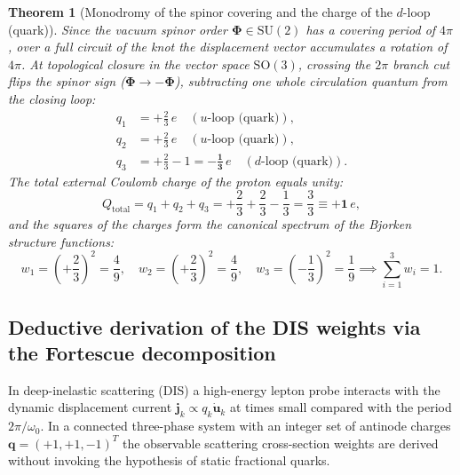\documentclass[11pt,a4paper]{article}
\newtheorem{theorem}{Theorem}
\theoremstyle{definition}
\theoremstyle{remark}
\begin{document}
\begin{theorem}[Monodromy of the spinor covering and the charge of the $d$-loop (quark)]
\label{thm:d_quark_charge_spinor_cut}
Since the vacuum spinor order $\boldsymbol{\Phi} \in \mathrm{SU}(2)$ has a covering period of $4\pi$, over a full circuit of the knot the displacement vector accumulates a rotation of $4\pi$. At topological closure in the vector space $\mathrm{SO}(3)$, crossing the $2\pi$ branch cut flips the spinor sign ($\boldsymbol{\Phi} \to -\boldsymbol{\Phi}$), subtracting one whole circulation quantum from the closing loop:
\begin{align}
    q_1 &= +\frac{2}{3} \, e \quad (u\text{-loop (quark)}), \label{eq:q_u1_exact} \\
    q_2 &= +\frac{2}{3} \, e \quad (u\text{-loop (quark)}), \label{eq:q_u2_exact} \\
    q_3 &= +\frac{2}{3} - 1 = -\frac{\mathbf{1}}{\mathbf{3}} \, e \quad (d\text{-loop (quark)}). \label{eq:q_d_exact}
\end{align}
The total external Coulomb charge of the proton equals unity:
\begin{equation}
    Q_{\mathrm{total}} = q_1 + q_2 + q_3 = +\frac{2}{3} + \frac{2}{3} - \frac{1}{3} = \frac{3}{3} \equiv +\mathbf{1} \, e,
\end{equation}
and the squares of the charges form the canonical spectrum of the Bjorken structure functions:
\begin{equation}
    w_1 = \left(+\frac{2}{3}\right)^2 = \frac{4}{9}, \quad w_2 = \left(+\frac{2}{3}\right)^2 = \frac{4}{9}, \quad w_3 = \left(-\frac{1}{3}\right)^2 = \frac{1}{9} \implies \sum_{i=1}^3 w_i = 1.
\end{equation}
\end{theorem}

\subsection{Deductive derivation of the DIS weights via the Fortescue decomposition}

In deep-inelastic scattering (DIS) a high-energy lepton probe interacts with the dynamic displacement current $\mathbf{j}_k \propto q_k \dot{\mathbf{u}}_k$ at times small compared with the period $2\pi/\omega_0$. In a connected three-phase system with an integer set of antinode charges $\mathbf{q} = (+1, +1, -1)^T$ the observable scattering cross-section weights are derived without invoking the hypothesis of static fractional quarks.
\end{document}

